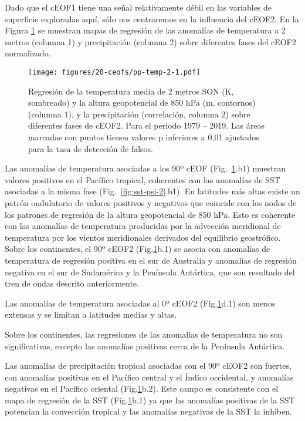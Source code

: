 \documentclass[12pt,oneside]{reedthesis}
\begin{document}
Dado que el cEOF1 tiene una señal relativamente débil en las variables de superficie exploradas aquí, sólo nos centraremos en la influencia del cEOF2.
En la Figura \ref{fig:pp-temp-2} se muestran mapas de regresión de las anomalías de temperatura a 2 metros (columna 1) y precipitación (columna 2) sobre diferentes fases del cEOF2 normalizado.


\begin{figure}
\centering
\texttt{[image: figures/20-ceofs/pp-temp-2-1.pdf]}
\caption{\label{fig:pp-temp-2}Regresión de la temperatura media de 2 metros SON (K, sombreado) y la altura geopotencial de 850 hPa (m, contornos) (columna 1), y la precipitación (correlación, columna 2) sobre diferentes fases de cEOF2. Para el periodo 1979 -- 2019. Las áreas marcadas con puntos tienen valores p inferiores a 0,01 ajustados para la tasa de detección de falsos.}
\end{figure}
Las anomalías de temperatura asociadas a los 90º cEOF (Fig.~\ref{fig:pp-temp-2}.b1) muestran valores positivos en el Pacífico tropical, coherentes con las anomalías de SST asociadas a la misma fase (Fig.~\ref{fig:sst-psi-2}.b1).
En latitudes más altas existe un patrón ondulatorio de valores positivos y negativos que coincide con los nodos de los patrones de regresión de la altura geopotencial de 850 hPa.
Esto es coherente con las anomalías de temperatura producidas por la advección meridional de temperatura por los vientos meridionales derivados del equilibrio geostrófico.
Sobre los continentes, el 90º cEOF2 (Fig.\ref{fig:pp-temp-2}b.1) se asocia con anomalías de temperatura de regresión positiva en el sur de Australia y anomalías de regresión negativa en el sur de Sudamérica y la Península Antártica, que son resultado del tren de ondas descrito anteriormente.

Las anomalías de temperatura asociadas al 0º cEOF2 (Fig.\ref{fig:pp-temp-2}d.1) son menos extensas y se limitan a latitudes medias y altas.

Sobre los continentes, las regresiones de las anomalías de temperatura no son significativas, excepto las anomalías positivas cerca de la Península Antártica.

Las anomalías de precipitación tropical asociadas con el 90º cEOF2 son fuertes, con anomalías positivas en el Pacífico central y el Índico occidental, y anomalías negativas en el Pacífico oriental (Fig.\ref{fig:pp-temp-2}b.2).
Este campo es consistente con el mapa de regresión de la SST (Fig.\ref{fig:pp-temp-2}b.1) ya que las anomalías positivas de la SST potencian la convección tropical y las anomalías negativas de la SST la inhiben.
\end{document}
